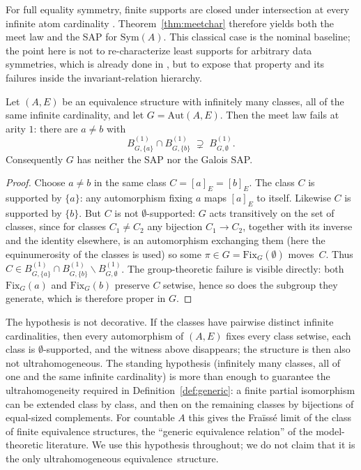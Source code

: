 \documentclass{lmcs}
\newcommand{\Sym}{\mathrm{Sym}}
\newcommand{\Fix}{\mathrm{Fix}}
\newcommand{\Aut}{\mathrm{Aut}}
\begin{document}
For full equality symmetry, finite supports are closed under
intersection at every infinite atom cardinality \cite{AC20}.
Theorem~\ref{thm:meetchar} therefore yields both the meet law and the
\textup{SAP} for $\Sym(A)$. This classical case is the nominal baseline; the point here is not to re-characterize least supports for arbitrary data symmetries, which is already done in \cite{BKL14}, but to expose that property and its failures inside the invariant-relation hierarchy.

\begin{thm}
\label{thm:equivfail}
Let $(A,E)$ be an equivalence structure with infinitely many classes,
all of the same infinite cardinality, and let $G=\Aut(A,E)$. Then the
meet law fails at arity $1$: there are $a\neq b$ with
\[
B^{(1)}_{G,\{a\}}\cap B^{(1)}_{G,\{b\}}\;\supsetneq\;
B^{(1)}_{G,\emptyset}.
\]
Consequently $G$ has neither the \textup{SAP} nor the Galois
\textup{SAP}.
\end{thm}

\begin{proof}
Choose $a\neq b$ in the same class $C=[a]_E=[b]_E$. The class $C$ is
supported by $\{a\}$: any automorphism fixing $a$ maps $[a]_E$ to
itself. Likewise $C$ is supported by $\{b\}$. But $C$ is not
$\emptyset$-supported: $G$ acts transitively on the set of classes,
since for classes $C_1\neq C_2$ any bijection $C_1\to C_2$, together
with its inverse and the identity elsewhere, is an automorphism
exchanging them (here the equinumerosity of the classes is used)
so some $\pi\in G=\Fix_G(\emptyset)$ moves~$C$. Thus $C\in
B^{(1)}_{G,\{a\}}\cap B^{(1)}_{G,\{b\}}\smallsetminus B^{(1)}_{G,\emptyset}$. The group-theoretic failure is visible directly: both $\Fix_G(a)$ and $\Fix_G(b)$ preserve $C$ setwise, hence so does the subgroup they generate, which is therefore proper in $G$.
\end{proof}

\begin{rem}\label{rem:whyequinum}
The hypothesis is not decorative. If the classes have pairwise
distinct infinite cardinalities, then every automorphism of $(A,E)$
fixes every class setwise, each class is $\emptyset$-supported, and
the witness above disappears; the structure is then also not
ultrahomogeneous. The standing hypothesis (infinitely many classes, all of one and the same infinite cardinality) is more than enough to guarantee the
ultrahomogeneity required in Definition~\ref{def:generic}: a finite
partial isomorphism can be extended class by class, and then on the
remaining classes by bijections of equal-sized complements. For
countable $A$ this gives the Fra\"iss\'e limit of the class of finite
equivalence structures, the ``generic equivalence relation'' of the
model-theoretic literature. We use this hypothesis throughout;
we do not claim that it is the only ultrahomogeneous equivalence~structure.
\end{rem}
\end{document}
